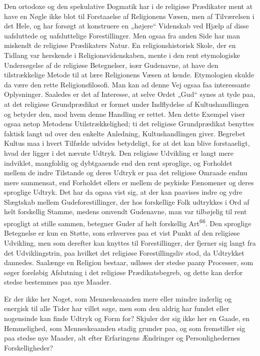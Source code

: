 \documentclass[12pt,a4paper,openany]{book}
\newcommand{\opage}[1]{\marginnote{\footnotesize\textit{[#1]}}}
\begin{document}
Den ortodoxe og den spekulative Dogmatik har i de religiøse Prædikater
ment at have en Nøgle ikke blot til Forstaaelse af Religionens Væsen,
men af Tilværelsen i det Hele, og har forsøgt at konstruere en „højere“
Videnskab ved Hjælp af disse uafsluttede og uafsluttelige
Forestillinger. Men ogsaa fra anden Side har man miskendt de religiøse
Prædikaters Natur. En religionshistorisk Skole, der en Tidlang var
herskende i Religionsvidenskaben, mente i den rent etymologiske
Undersøgelse af de religiøse Betegnelser, især Gudenavne, at have den
tilstrækkelige Metode til at lære Religionens Væsen at kende.
Etymologien skulde da være den rette Religionsfilosofi. Man kan ad denne
Vej ogsaa faa interessante Oplysninger. Saaledes er det af Interesse, at
selve Ordet „Gud“ synes at tyde paa, at det religiøse Grundprædikat er
formet under Indflydelse af Kultushandlingen og betyder den, mod hvem
denne Handling er rettet. Men dette Exempel viser ogsaa netop Metodens
Utilstrækkelighed; ti det religiøse Grundprædikat benyttes faktisk langt
ud over den enkelte Anledning, Kultushandlingen giver. Begrebet Kultus
maa i hvert Tilfælde udvides betydeligt, for at det kan blive
forstaaeligt, hvad der ligger i det nævnte Udtryk. Den religiøse
Udvikling er langt mere indviklet, mangfoldig og dybtgaaende end den
rent sproglige, og Forholdet mellem de indre Tilstande og deres Udtryk
er paa det religiøse Omraade endnu mere sammensat, end Forholdet ellers
er mellem de psykiske Fænomener og deres sproglige Udtryk. Det har da
ogsaa vist sig, at der kan paavises indre og ydre Slægtskab mellem
Gudeforestillinger, der hos forskellige Folk udtrykkes i Ord af helt
forskellig Stamme, medens omvendt Gudenavne, man var tilbøjelig til rent
sprogligt at stille sammen, betegner Guder af helt forskellig
Art\textsuperscript{66}. Den sproglige Betegnelse er kun en Støtte, som
erhverves paa et vist Punkt af den religiøse Udvikling, men som derefter
kan knyttes til Forestillinger, der fjerner sig langt fra det
Udviklingstrin, paa hvilket det religiøse Forestillingsliv stod, da
Udtrykket dannedes. Saalænge en Religion bestaar, udløses der stedse
paany Processer, som søger foreløbig Afslutning i det religiøse
Prædikatsbegreb, og dette kan derfor stedse bestemmes paa nye Maader.

Er der ikke her Noget, som Menneskeaanden mere eller mindre inderlig og
energisk til alle Tider har villet søge, men som
\opage{126}den aldrig har fundet eller nogensinde kan finde Udtryk og
Form for? Skjuler der sig ikke her en Gaade, en Hemmelighed, som
Menneskeaanden stadig grunder paa, og som fremstiller sig paa stedse nye
Maader, alt efter Erfaringens Ændringer og Personlighedernes
Forskelligheder?
\end{document}
